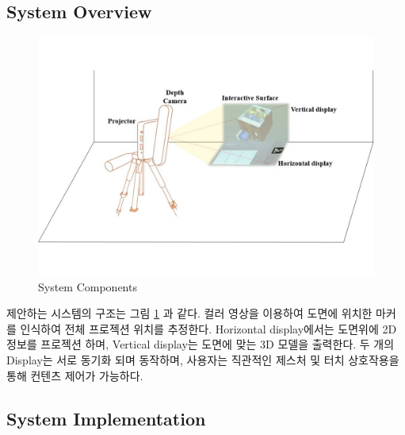 \subsection{System Overview}
\begin{figure}[ht!]
	\centering
    \includegraphics[width=\textwidth]{3-System/overview}
	\caption{System Components}
    \label{fig:overview}
\end{figure}

제안하는 시스템의 구조는 그림 \ref{fig:overview} 과 같다. 컬러 영상을 이용하여 도면에 위치한 마커를 인식하여 전체 프로젝션 위치를 추정한다. Horizontal display에서는 도면위에 2D 정보를 프로젝션 하며, Vertical display는 도면에 맞는 3D 모델을 출력한다. 두 개의 Display는 서로 동기화 되며 동작하며, 사용자는 직관적인 제스처 및 터치 상호작용을 통해 컨텐츠 제어가 가능하다.  

\subsection{System Implementation}
